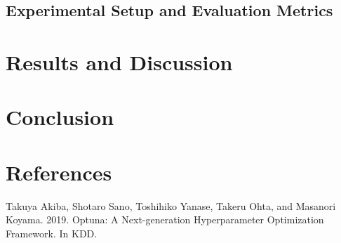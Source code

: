 \documentclass[conference]{IEEEtran}
\begin{document}

\subsection{Experimental Setup and Evaluation Metrics}


\section{Results and Discussion}


\section{Conclusion}

\section{References}

Takuya Akiba, Shotaro Sano, Toshihiko Yanase, Takeru Ohta, and Masanori Koyama. 2019.
	Optuna: A Next-generation Hyperparameter Optimization Framework. In KDD.


\end{document}
